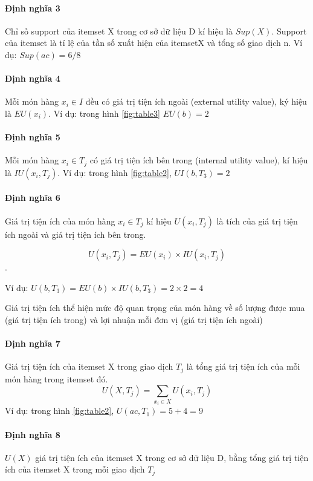 \paragraph{Định nghĩa 3} Chỉ số support của itemset X trong cơ sở dữ liệu D kí hiệu là $Sup(X)$. Support của itemset là tỉ lệ của tần số xuất hiện của itemsetX và tổng số giao dịch n. Ví dụ: $Sup(ac) = 6/8$

\paragraph{Định nghĩa 4} Mỗi món hàng $x_i \in I$ đều có giá trị tiện ích ngoài (external utility value), ký hiệu là $EU(x_i)$. Ví dụ: trong hình \ref{fig:table3} $EU(b) = 2$

\paragraph{Định nghĩa 5} Mỗi món hàng $x_i \in T_j$ có giá trị tiện ích bên trong (internal utility value), kí hiệu là $IU(x_i, T_j)$. Ví dụ: trong hình \ref{fig:table2}, $UI(b, T_3) = 2$

\paragraph{Định nghĩa 6} Giá trị tiện ích của món hàng $x_i \in T_j$ kí hiệu $U(x_i, T_j)$ là tích của giá trị tiện ích ngoài và giá trị tiện ích bên trong. 

$$ U(x_i, T_j) = EU(x_i) \times IU(x_i, T_j) $$ .

Ví dụ: $U(b, T_3) = EU(b) \times IU(b, T_3) = 2 \times 2 = 4$

Giá trị tiện ích thể hiện mức độ quan trọng của món hàng về số lượng được mua (giá trị tiện ích trong) và lợi nhuận mỗi đơn vị (giá trị tiện ích ngoài)

\paragraph{Định nghĩa 7} Giá trị tiện ích của itemset X trong giao dịch $T_j$ là tổng giá trị tiện ích của mỗi món hàng trong itemset đó. 
$$U(X, T_j) = \sum_{x_i \in X} U(x_i, T_j)$$
Ví dụ: trong hình \ref{fig:table2}, $U(ac, T_1) = 5 + 4 = 9$

\paragraph{Định nghĩa 8} $U(X)$ giá trị tiện ích của itemset X trong cơ sở dữ liệu D, bằng tổng giá trị tiện ích của itemset X trong mỗi giao dịch $T_j$

